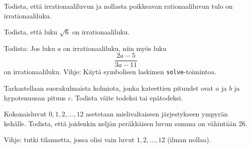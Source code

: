 \begin{tehtavasivu}
	\begin{tehtava}
		Todista, että irrationaaliluvun ja nollasta poikkeavan rationaaliluvun tulo on irrationaaliluku.
	\end{tehtava}

	\begin{tehtava}
		Todista, että luku $\sqrt{6}$ on irrationaaliluku.
	\end{tehtava}

	\begin{tehtava}
		Todista: Jos luku $a$ on irrationaaliluku, niin
		myös luku
		\[
			\frac{2a-5}{3a-11}
		\]
		on irrationaaliluku. Vihje: Käytä symbolisen laskimen
		\texttt{solve}-toimintoa.
	\end{tehtava}

	\begin{tehtava}
		Tarkastellaan suorakulmaista kolmiota, jonka kateettien
		pituudet ovat $a$ ja $b$ ja hypotenuusan pituus $c$.
		Todista väite todeksi tai epätodeksi.
		\begin{alakohdat}
		\end{alakohdat}
		\begin{vastaus}
			\begin{alakohdat}
				\alakohta{(Tosi.)}
				\alakohta{(Tosi.)}
			\end{alakohdat}
		\end{vastaus}
	\end{tehtava}

	\begin{tehtava}
		Kokonaisluvut $0, 1, 2, \ldots, 12$ asetetaan
		mielivaltaiseen järjestykseen ympyrän kehälle. Todista,
		että joidenkin neljän peräkkäisen luvun summa on
		vähintään 26.
		\begin{vastaus}
			Vihje: tutki tilannetta, jossa olisi vain luvut $1, 2, \ldots, 12$ (ilman nollaa).
		\end{vastaus}
	\end{tehtava}

\end{tehtavasivu}

\setcounter{tehtava}{0}

